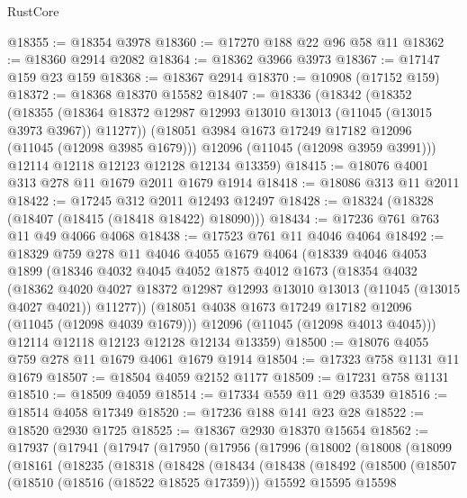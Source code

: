 \begin{lexlean}{RustCore}
\begin{coremodule}
@18355 := @18354 @3978
@18360 := @17270 @188 @22 @96 @58 @11
@18362 := @18360 @2914 @2082
@18364 := @18362 @3966 @3973
@18367 := @17147 @159 @23 @159
@18368 := @18367 @2914
@18370 := @10908 (@17152 @159)
@18372 := @18368 @18370 @15582
@18407 := @18336
    (@18342
      (@18352
        (@18355 (@18364 @18372 @12987 @12993 @13010 @13013 (@11045 (@13015 @3973 @3967)) @11277))
        (@18051 @3984 @1673 @17249 @17182 @12096 (@11045 (@12098 @3985 @1679)))
        @12096
        (@11045 (@12098 @3959 @3991)))
      @12114
      @12118
      @12123
      @12128
      @12134
      @13359)
@18415 := @18076 @4001 @313 @278 @11 @1679 @2011 @1679 @1914
@18418 := @18086 @313 @11 @2011
@18422 := @17245 @312 @2011 @12493 @12497
@18428 := @18324 (@18328 (@18407 (@18415 (@18418 @18422) @18090)))
@18434 := @17236 @761 @763 @11 @49 @4066 @4068
@18438 := @17523 @761 @11 @4046 @4064
@18492 := @18329
    @759
    @278
    @11
    @4046
    @4055
    @1679
    @4064
    (@18339
      @4046
      @4053
      @1899
      (@18346
        @4032
        @4045
        @4052
        @1875
        @4012
        @1673
        (@18354
          @4032
          (@18362
            @4020
            @4027
            @18372
            @12987
            @12993
            @13010
            @13013
            (@11045 (@13015 @4027 @4021))
            @11277))
        (@18051 @4038 @1673 @17249 @17182 @12096 (@11045 (@12098 @4039 @1679)))
        @12096
        (@11045 (@12098 @4013 @4045)))
      @12114
      @12118
      @12123
      @12128
      @12134
      @13359)
@18500 := @18076 @4055 @759 @278 @11 @1679 @4061 @1679 @1914
@18504 := @17323 @758 @1131 @11 @1679
@18507 := @18504 @4059 @2152 @1177
@18509 := @17231 @758 @1131
@18510 := @18509 @4059
@18514 := @17334 @559 @11 @29 @3539
@18516 := @18514 @4058 @17349
@18520 := @17236 @188 @141 @23 @28
@18522 := @18520 @2930 @1725
@18525 := @18367 @2930 @18370 @15654
@18562 := @17937
    (@17941
      (@17947
        (@17950
          (@17956
            (@17996
              (@18002
                (@18008
                  (@18099
                    (@18161
                      (@18235
                        (@18318
                          (@18428
                            (@18434
                              (@18438
                                (@18492
                                  (@18500
                                    (@18507
                                      (@18510 (@18516 (@18522 @18525 @17359)))
                                      @15592
                                      @15595
                                      @15598

\end{coremodule}
\end{lexlean}
